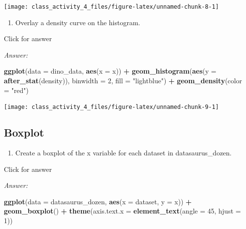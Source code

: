 \documentclass[
]{book}
\newenvironment{Shaded}{\begin{snugshade}}{\end{snugshade}}
\newcommand{\AttributeTok}[1]{\textcolor[rgb]{0.13,0.29,0.53}{#1}}
\newcommand{\DecValTok}[1]{\textcolor[rgb]{0.00,0.00,0.81}{#1}}
\newcommand{\FunctionTok}[1]{\textcolor[rgb]{0.13,0.29,0.53}{\textbf{#1}}}
\newcommand{\NormalTok}[1]{#1}
\newcommand{\SpecialCharTok}[1]{\textcolor[rgb]{0.81,0.36,0.00}{\textbf{#1}}}
\newcommand{\StringTok}[1]{\textcolor[rgb]{0.31,0.60,0.02}{#1}}
\providecommand{\tightlist}{%
  \setlength{\itemsep}{0pt}\setlength{\parskip}{0pt}}
\begin{document}
\texttt{[image: class\_activity\_4\_files/figure-latex/unnamed-chunk-8-1]}

\begin{enumerate}
\def\labelenumi{\alph{enumi}.}
\setcounter{enumi}{1}
\tightlist
\item
  Overlay a density curve on the histogram.
\end{enumerate}

Click for answer

\emph{Answer:}

\begin{Shaded}
\begin{Highlighting}[]
\FunctionTok{ggplot}\NormalTok{(}\AttributeTok{data =}\NormalTok{ dino\_data, }\FunctionTok{aes}\NormalTok{(}\AttributeTok{x =}\NormalTok{ x)) }\SpecialCharTok{+}
  \FunctionTok{geom\_histogram}\NormalTok{(}\FunctionTok{aes}\NormalTok{(}\AttributeTok{y =} \FunctionTok{after\_stat}\NormalTok{(density)), }\AttributeTok{binwidth =} \DecValTok{2}\NormalTok{, }\AttributeTok{fill =} \StringTok{"lightblue"}\NormalTok{) }\SpecialCharTok{+}
  \FunctionTok{geom\_density}\NormalTok{(}\AttributeTok{color =} \StringTok{"red"}\NormalTok{)}
\end{Highlighting}
\end{Shaded}

\texttt{[image: class\_activity\_4\_files/figure-latex/unnamed-chunk-9-1]}

\hypertarget{boxplot}{%
\subsection{Boxplot}\label{boxplot}}

\begin{enumerate}
\def\labelenumi{\alph{enumi}.}
\tightlist
\item
  Create a boxplot of the x variable for each dataset in datasaurus\_dozen.
\end{enumerate}

Click for answer

\emph{Answer:}

\begin{Shaded}
\begin{Highlighting}[]
\FunctionTok{ggplot}\NormalTok{(}\AttributeTok{data =}\NormalTok{ datasaurus\_dozen, }\FunctionTok{aes}\NormalTok{(}\AttributeTok{x =}\NormalTok{ dataset, }\AttributeTok{y =}\NormalTok{ x)) }\SpecialCharTok{+}
  \FunctionTok{geom\_boxplot}\NormalTok{() }\SpecialCharTok{+}
  \FunctionTok{theme}\NormalTok{(}\AttributeTok{axis.text.x =} \FunctionTok{element\_text}\NormalTok{(}\AttributeTok{angle =} \DecValTok{45}\NormalTok{, }\AttributeTok{hjust =} \DecValTok{1}\NormalTok{))}
\end{Highlighting}
\end{Shaded}
\end{document}
